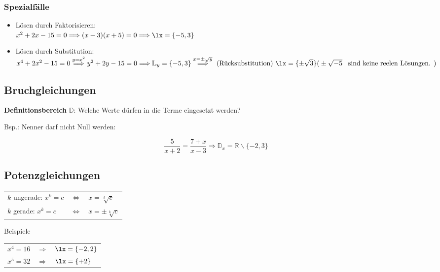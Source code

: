 \begin{multicols}{2}
\subsubsection*{Spezialfälle}
\begin{itemize}
\item Lösen durch Faktorisieren:\\
$x^2+2x-15=0 \Longrightarrow (x-3)(x+5)=0 \Longrightarrow \lx=\{-5,3\}$

\item Lösen durch Substitution:\\
$x^4+2x^2-15=0 \stackrel{y=x^2}{\Longrightarrow}\\
y^2+2y-15=0 \Longrightarrow \mathbb{L}_y=\{-5,3\} \stackrel{x=\pm{}\sqrt{y}}{\Longrightarrow}
\textrm{ (Rücksubstitution) } \lx=\{\pm\sqrt{3}\}\\
\textrm{(} \pm\sqrt{-5} \textrm{ \, sind keine reelen Lösungen. )}$

\end{itemize}

\subsection*{Bruchgleichungen}

\textbf{Definitionsbereich} $\mathbb{D}$: Welche Werte dürfen in die Terme eingesetzt werden?

Bsp.: Nenner darf nicht Null werden:

$$\frac5{x+2}=\frac{7+x}{x-3} \Rightarrow{} \mathbb{D}_x=\mathbb{R}\backslash{}\{-2, 3\}$$

\subsection*{Potenzgleichungen}


\begin{tabular}{lcl}
$k$ ungerade: $x^k=c$ & $\Leftrightarrow$ & $x=\sqrt[k]{c}$\\
$k$ gerade:   $x^k=c$ & $\Leftrightarrow$ & $x=\pm\sqrt[k]{c}$\\
\end{tabular}

Beispiele

\begin{tabular}{rcl}
$x^4=16$ & $\Longrightarrow$ & $\lx=\{-2, 2\}  $ \\
$x^5=32$ & $\Longrightarrow$ & $\lx=\{+2\}  $ \\


\end{tabular}
\end{multicols}
